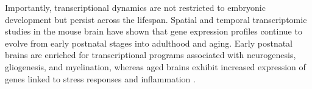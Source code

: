 Importantly, transcriptional dynamics are not restricted to embryonic development but persist across the lifespan. Spatial and temporal transcriptomic studies in the mouse brain have shown that gene expression profiles continue to evolve from early postnatal stages into adulthood and aging. Early postnatal brains are enriched for transcriptional programs associated with neurogenesis, gliogenesis, and myelination, whereas aged brains exhibit increased expression of genes linked to stress responses and inflammation \citep{CONACHERSpatialTranscriptomicsReveals2025}.
\endinput